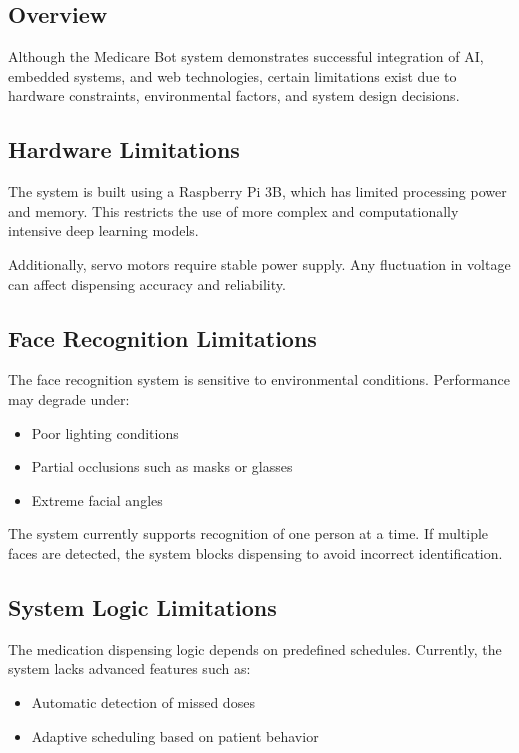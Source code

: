 
\subsection{Overview}

Although the Medicare Bot system demonstrates successful integration of AI, embedded systems, and web technologies, certain limitations exist due to hardware constraints, environmental factors, and system design decisions.

\subsection{Hardware Limitations}

The system is built using a Raspberry Pi 3B, which has limited processing power and memory. This restricts the use of more complex and computationally intensive deep learning models.

Additionally, servo motors require stable power supply. Any fluctuation in voltage can affect dispensing accuracy and reliability.

\subsection{Face Recognition Limitations}

The face recognition system is sensitive to environmental conditions. Performance may degrade under:

\begin{itemize}
    \item Poor lighting conditions
    \item Partial occlusions such as masks or glasses
    \item Extreme facial angles
\end{itemize}

The system currently supports recognition of one person at a time. If multiple faces are detected, the system blocks dispensing to avoid incorrect identification.

\subsection{System Logic Limitations}

The medication dispensing logic depends on predefined schedules. Currently, the system lacks advanced features such as:

\begin{itemize}
    \item Automatic detection of missed doses
    \item Adaptive scheduling based on patient behavior
\end{itemize}


